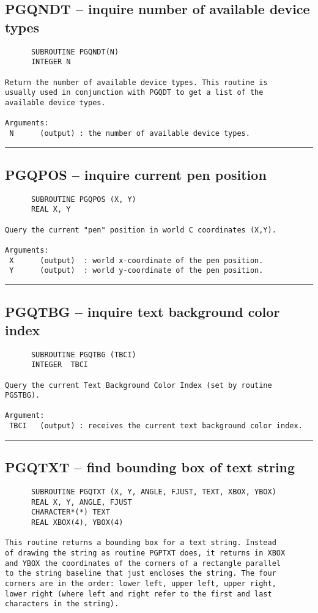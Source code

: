 {\subsection*{PGQNDT -- inquire number of available device types }
\begin{verbatim}
      SUBROUTINE PGQNDT(N)
      INTEGER N

Return the number of available device types. This routine is
usually used in conjunction with PGQDT to get a list of the
available device types.

Arguments:
 N      (output) : the number of available device types.
\end{verbatim}
\hrule


\subsection*{PGQPOS -- inquire current pen position }
\begin{verbatim}
      SUBROUTINE PGQPOS (X, Y)
      REAL X, Y

Query the current "pen" position in world C coordinates (X,Y).

Arguments:
 X      (output)  : world x-coordinate of the pen position.
 Y      (output)  : world y-coordinate of the pen position.
\end{verbatim}
\hrule


\subsection*{PGQTBG -- inquire text background color index }
\begin{verbatim}
      SUBROUTINE PGQTBG (TBCI)
      INTEGER  TBCI

Query the current Text Background Color Index (set by routine
PGSTBG).

Argument:
 TBCI   (output) : receives the current text background color index.
\end{verbatim}
\hrule


\subsection*{PGQTXT -- find bounding box of text string }
\begin{verbatim}
      SUBROUTINE PGQTXT (X, Y, ANGLE, FJUST, TEXT, XBOX, YBOX)
      REAL X, Y, ANGLE, FJUST
      CHARACTER*(*) TEXT
      REAL XBOX(4), YBOX(4)

This routine returns a bounding box for a text string. Instead
of drawing the string as routine PGPTXT does, it returns in XBOX
and YBOX the coordinates of the corners of a rectangle parallel
to the string baseline that just encloses the string. The four
corners are in the order: lower left, upper left, upper right,
lower right (where left and right refer to the first and last
characters in the string).


\end{verbatim}}
